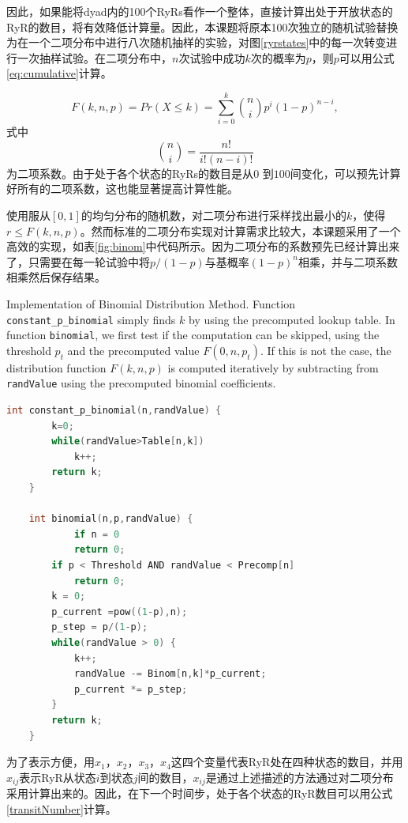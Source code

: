 因此，如果能将dyad内的100个RyRs看作一个整体，直接计算出处于开放状态的RyR的数目，将有效降低计算量。因此，本课题将原本100次独立的随机试验替换为在一个二项分布中进行八次随机抽样的实验，对图\ref{ryrstates}中的每一次转变进行一次抽样试验。在二项分布中，$n$次试验中成功$k$次的概率为$p$，则$p$可以用公式\ref{eq:cumulative}计算。

\begin{equation}
F(k,n,p)=Pr({X}\leq{k})=\sum_{i=0}^{k}\binom{n}{i}p^i(1-p)^{n-i},
\label{eq:cumulative}
\end{equation}
式中$$\binom{n}{i}=\frac{n!}{i!(n-i)!}$$为二项系数。由于处于各个状态的RyRs的数目是从$0$ 到$100$间变化，可以预先计算好所有的二项系数，这也能显著提高计算性能。

使用服从$[0,1]$的均匀分布的随机数，对二项分布进行采样找出最小的$k$，使得$r \leq F(k,n,p)$。然而标准的二项分布实现对计算需求比较大，本课题采用了一个高效的实现，如表\ref{fig:binom}中代码所示。因为二项分布的系数预先已经计算出来了，只需要在每一轮试验中将$p/(1-p)$与基概率$(1-p)^n$相乘，并与二项系数相乘然后保存结果。

 \begin{table}
\caption{Implementation of Binomial Distribution Method. Function {\tt constant\_p\_binomial} simply finds $k$ by using the precomputed lookup table. In function {\tt binomial},
we first test if the computation can be skipped, using the threshold $p_t$ and the precomputed value $F(0,n,p_t)$. If this is not the case, the distribution function $F(k,n,p)$ is computed iteratively by subtracting from {\tt randValue} using the precomputed binomial coefficients.}
\label{fig:binom}
\begin{lstlisting}[language=C++, basicstyle=\ttfamily\footnotesize]
    int constant_p_binomial(n,randValue) {
        k=0;
        while(randValue>Table[n,k]) 
            k++;
        return k;
    }

    int binomial(n,p,randValue) {
        	if n = 0
		    return 0;
        if p < Threshold AND randValue < Precomp[n]
            return 0;
        k = 0;
        p_current =pow((1-p),n);
        p_step = p/(1-p);
        while(randValue > 0) {
            k++;
            randValue -= Binom[n,k]*p_current;
            p_current *= p_step;
        }
        return k;
    }  
           \end{lstlisting}
\end{table}

为了表示方便，用$x_1$，$x_2$，$x_3$，$x_4$这四个变量代表RyR处在四种状态的数目，并用$x_{ij}$表示RyR从状态$i$到状态$j$间的数目，$x_{ij}$是通过上述描述的方法通过对二项分布采用计算出来的。因此，在下一个时间步，处于各个状态的RyR数目可以用公式\ref{transitNumber}计算。

